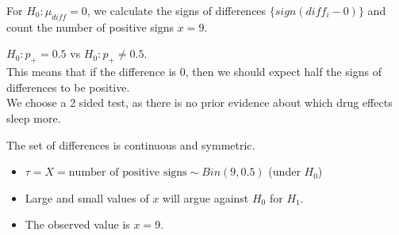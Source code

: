 \documentclass[t,xcolor=pdftex,dvipsnames,table]{beamer}
\begin{document}
\begin{frame}[fragile]{}

For $H_{0}: \mu_{diff} = 0$, we calculate the signs of differences $\{ sign(diff_{i}-0) \}$  and count the number of positive signs $x=9$.

\vspace{.5cm}
$H_{0}: p_{+} = 0.5$ vs $H_{0}: p_{+} \neq 0.5$.  \\
This means that if the difference is 0, then we should expect half the signs of differences to be positive.\\
We choose a 2 sided test, as there is no prior evidence about which drug effects sleep more.

\vspace{.5cm}
 The set of differences is continuous and symmetric.

\vspace{.5cm}
\begin{itemize}
\item $\tau = X =  \mbox{number of positive signs} \sim Bin(9,0.5)$ (under $H_{0}$) 
\item Large and small values of $x$ will argue against $H_{0}$ for $H_{1}$. \\
\item The observed value is $x=9$. 
\end{itemize}
\end{frame}
\end{document}
